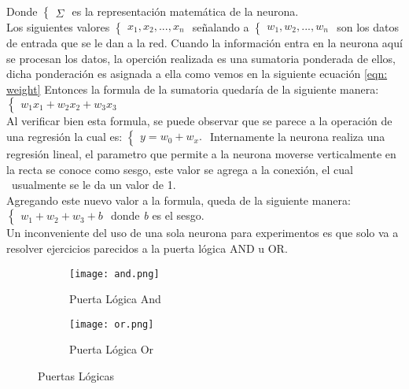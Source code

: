         Donde
        $\begin{cases}  
            \Sigma
        \end{cases}$
        es la representaci\'on matem\'atica de la neurona. \\
        Los siguientes valores
        $\begin{cases}
            x_1, x_2, ... , x_n
        \end{cases}$
        señalando a 
        $\begin{cases} \label{eqn: weight}
            w_1, w_2, ... , w_n 
        \end{cases}$ 
        son los datos de entrada que se le dan a la red.
        Cuando la información entra en la neurona aqu\'i se procesan los datos, la operci\'on realizada 
        es una sumatoria ponderada de ellos, dicha ponderaci\'on es asignada a ella  como vemos en la siguiente 
        ecuaci\'on \eqref{eqn: weight}
        Entonces la formula de la sumatoria quedar\'ia de la siguiente manera:
        $\begin{cases} \label{eqn: summation}
            w_1x_1 + w_2x_2 + w_3x_3
        \end{cases}$ \\
        Al verificar bien esta formula, se puede observar que se parece a la operaci\'on de una regresi\'on 
        la cual es:
        $\begin{cases}
            y = w_0 + w_x.
        \end{cases}$
        Internamente la neurona realiza una regresi\'on lineal, el parametro que permite a la neurona 
        moverse verticalmente en la recta se conoce como sesgo, este valor se agrega a la conexi\'on, el cual \
        usualmente se le da un valor de 1. \\
        Agregando este nuevo valor a la formula, queda de la siguiente manera: \\
        $\begin{cases}
            w_1 + w_2 + w_3 + b
        \end{cases}$ 
        donde \textit{b} es el sesgo. \\
        
        Un inconveniente del uso de una sola neurona para experimentos es que solo 
        va a resolver ejercicios parecidos a la puerta l\'ogica AND u OR.
        
        \begin{figure}[H]
            \begin{subfigure}[H]{0.49\textwidth}
                \texttt{[image: and.png]}
                \caption{Puerta L\'ogica And}
                \label{fig:f1}
            \end{subfigure}
            \hfill
            \begin{subfigure}[H]{0.49\textwidth}
                \texttt{[image: or.png]}
                \caption{Puerta L\'ogica Or}
                \label{fig:f2}
            \end{subfigure}
            \caption{Puertas L\'ogicas \cite{mcmahon2014}}
        \end{figure}
        
